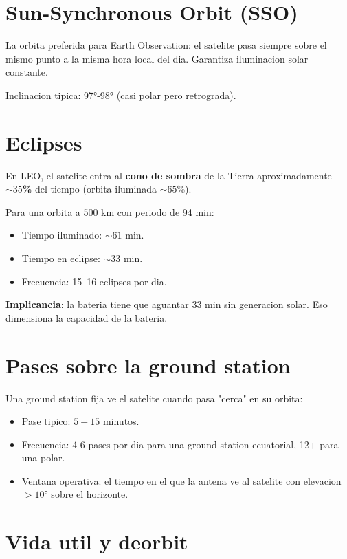 \documentclass[11pt,a4paper,oneside,openright]{book}
\begin{document}
\section{Sun-Synchronous Orbit (SSO)}

La orbita preferida para Earth Observation: el satelite pasa siempre
sobre el mismo punto a la misma hora local del dia. Garantiza
iluminacion solar constante.

Inclinacion tipica: 97°-98° (casi polar pero retrograda).

\section{Eclipses}

En LEO, el satelite entra al \textbf{cono de sombra} de la Tierra
aproximadamente \textbf{$\sim 35$\%} del tiempo (orbita iluminada $\sim 65$\%).

\begin{calculo}
Para una orbita a 500 km con periodo de 94 min:
\begin{itemize}[leftmargin=1em]
  \item Tiempo iluminado: $\sim 61$ min.
  \item Tiempo en eclipse: $\sim 33$ min.
  \item Frecuencia: 15--16 eclipses por dia.
\end{itemize}
\end{calculo}

\textbf{Implicancia}: la bateria tiene que aguantar 33 min sin generacion
solar. Eso dimensiona la capacidad de la bateria.

\section{Pases sobre la ground station}

Una ground station fija ve el satelite cuando pasa "cerca" en su orbita:
\begin{itemize}[leftmargin=2em]
  \item Pase tipico: $5-15$ minutos.
  \item Frecuencia: 4-6 pases por dia para una ground station ecuatorial,
        12+ para una polar.
  \item Ventana operativa: el tiempo en el que la antena ve al satelite
        con elevacion $> 10$° sobre el horizonte.
\end{itemize}

\section{Vida util y deorbit}
\end{document}

